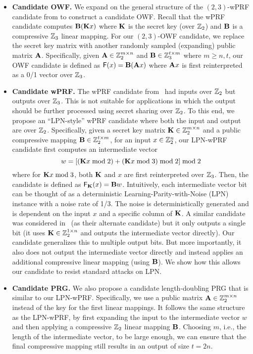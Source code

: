 \begin{itemize}
    \item \textbf{Candidate OWF.}
    We expand on the general structure of the $(2,3)$-wPRF candidate from \cite{boneh2018-darkmatter} to construct a candidate OWF. Recall that the wPRF candidate computes $\mat{B}(\mat{K}x)$ where $\mat{K}$ is the secret key (over $\mathbb{Z}_2$) and $\mat{B}$ is a compressive $\mathbb{Z}_3$ linear mapping. For our $(2,3)$-OWF candidate, we replace the secret key matrix with another randomly sampled (expanding) public matrix $\mat{A}$. Specifically, given $\mat{A} \in \Z_2^{m \times n}$ and $\mat{B} \in \Z_3^{t \times m}$ where $m \geq n,t$, our OWF candidate is defined as $\mathsf{F}(x) = \mat{B}(\mat{A}x)$ where $\mat{A}x$ is first reinterpreted as a 0/1 vector over $\mathbb{Z}_3$.

    \item \textbf{Candidate wPRF.}
    The wPRF candidate from~\cite{boneh2018-darkmatter} had inputs over $\mathbb{Z}_2$ but outputs over $\mathbb{Z}_3$. This is not suitable for applications in which the output should be further processed using secret sharing over $\mathbb{Z}_2$. To this end, we propose an ``LPN-style'' wPRF candidate where both the input and output are over $\mathbb{Z}_2$. Specifically, given a secret key matrix $\mat{K} \in \Z_2^{m \times n}$ and a public compressive mapping $\mat{B} \in \Z_2^{t \times m}$, for an input $x \in \mathbb{Z}_2^n$, our LPN-wPRF candidate first computes an intermediate vector
    \[
        w = [(\mat{K}x \bmod 2) + (\mat{K}x \bmod 3) \bmod 2] \bmod 2
    \]
    where for $\mat{K}x \bmod 3$, both $\mat{K}$ and $x$ are first reinterpreted over $\mathbb{Z}_3$. Then, the candidate is defined as $\mathsf{F}_\mat{K}(x) = \mat{B}w$. Intuitively, each intermediate vector bit can be thought of as a deterministic Learning-Parity-with-Noise (LPN) instance with a noise rate of 1/3. The noise is deterministically generated and is dependent on the input $x$ and a specific column of $\mat{K}$. A similar candidate was considered in~\cite{boneh2018-darkmatter} (as their alternate candidate) but it only outputs a single bit (it uses $\mat{K} \in \Z_2^{1 \times n}$ and outputs the intermediate vector directly). Our candidate generalizes this to multiple output bits. But more importantly, it also does not output the intermediate vector directly and instead applies an additional compressive linear mapping (using $\mat{B}$). We show how this allows our candidate to resist standard attacks on LPN.


    \item \textbf{Candidate PRG.}
    We also propose a candidate length-doubling PRG that is similar to our LPN-wPRF. Specifically, we use a public matrix $\mat{A} \in \Z_2^{m \times n}$ instead of the key for the first linear mappings. It follows the same structure as the LPN-wPRF, by first expanding the input to the intermediate vector $w$ and then applying a compressive $\mathbb{Z}_2$ linear mapping $\mat{B}$. Choosing $m$, i.e., the length of the intermediate vector, to be large enough, we can ensure that the final compressive mapping still results in an output of size $t = 2n$.


\end{itemize}
